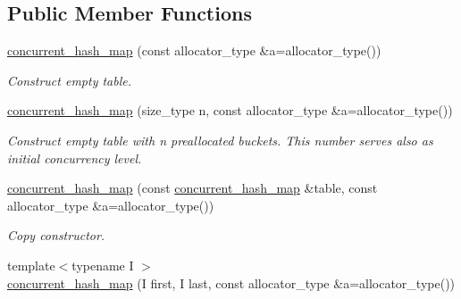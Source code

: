 \subsection*{Public Member Functions}
\begin{DoxyCompactItemize}
\item 
\hypertarget{classtbb_1_1interface5_1_1concurrent__hash__map_a4099225948ab299cf7abc43ec8c8c504}{}\hyperlink{classtbb_1_1interface5_1_1concurrent__hash__map_a4099225948ab299cf7abc43ec8c8c504}{concurrent\+\_\+hash\+\_\+map} (const allocator\+\_\+type \&a=allocator\+\_\+type())\label{classtbb_1_1interface5_1_1concurrent__hash__map_a4099225948ab299cf7abc43ec8c8c504}

\begin{DoxyCompactList}\small\item\em Construct empty table. \end{DoxyCompactList}\item 
\hypertarget{classtbb_1_1interface5_1_1concurrent__hash__map_a98c35338629328b16802f27c7ea1f4c2}{}\hyperlink{classtbb_1_1interface5_1_1concurrent__hash__map_a98c35338629328b16802f27c7ea1f4c2}{concurrent\+\_\+hash\+\_\+map} (size\+\_\+type n, const allocator\+\_\+type \&a=allocator\+\_\+type())\label{classtbb_1_1interface5_1_1concurrent__hash__map_a98c35338629328b16802f27c7ea1f4c2}

\begin{DoxyCompactList}\small\item\em Construct empty table with n preallocated buckets. This number serves also as initial concurrency level. \end{DoxyCompactList}\item 
\hypertarget{classtbb_1_1interface5_1_1concurrent__hash__map_a1e9c7e1650a87c6fdfd282c61587059e}{}\hyperlink{classtbb_1_1interface5_1_1concurrent__hash__map_a1e9c7e1650a87c6fdfd282c61587059e}{concurrent\+\_\+hash\+\_\+map} (const \hyperlink{classtbb_1_1interface5_1_1concurrent__hash__map}{concurrent\+\_\+hash\+\_\+map} \&table, const allocator\+\_\+type \&a=allocator\+\_\+type())\label{classtbb_1_1interface5_1_1concurrent__hash__map_a1e9c7e1650a87c6fdfd282c61587059e}

\begin{DoxyCompactList}\small\item\em Copy constructor. \end{DoxyCompactList}\item 
\hypertarget{classtbb_1_1interface5_1_1concurrent__hash__map_ae5554a86cf627e7a21de256920d03690}{}{\footnotesize template$<$typename I $>$ }\\\hyperlink{classtbb_1_1interface5_1_1concurrent__hash__map_ae5554a86cf627e7a21de256920d03690}{concurrent\+\_\+hash\+\_\+map} (I first, I last, const allocator\+\_\+type \&a=allocator\+\_\+type())\label{classtbb_1_1interface5_1_1concurrent__hash__map_ae5554a86cf627e7a21de256920d03690}


\end{DoxyCompactItemize}
